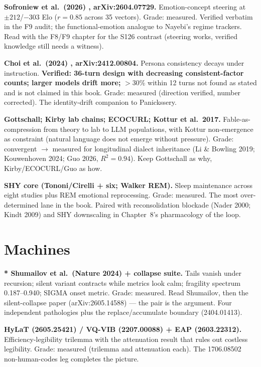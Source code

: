 \textbf{Sofroniew et al.\ (2026) \cite{sofroniew2026}, arXiv:2604.07729.} Emotion-concept steering at $\pm212$/$-$303 Elo ($r=0.85$ across 35 vectors). Grade: measured. Verified verbatim in the F9 audit; the functional-emotion analogue to Nayebi's regime trackers. Read with the F8/F9 chapter for the S126 contrast (steering works, verified knowledge still needs a witness).

\textbf{Choi et al.\ (2024) \cite{choi2024}, arXiv:2412.00804.} Persona consistency decays under instruction. \textbf{Verified: 36-turn design with decreasing consistent-factor counts; larger models drift more; }$>$30\% within 12 turns not found as stated and is not claimed in this book. Grade: measured (direction verified, number corrected). The identity-drift companion to Panickssery.

\textbf{Gottschall; Kirby lab chains; ECOCURL; Kottur et al.\ 2017.} Fable-as-compression from theory to lab to LLM populations, with Kottur non-emergence as constraint (natural language does not emerge without pressure). Grade: convergent $\to$ measured for longitudinal dialect inheritance (Li \& Bowling 2019; Kouwenhoven 2024; Guo 2026, $R^2=0.94$). Keep Gottschall as why, Kirby/ECOCURL/Guo as how.

\textbf{SHY core (Tononi/Cirelli + six; Walker REM).} Sleep maintenance across eight studies plus REM emotional reprocessing. Grade: measured. The most over-determined lane in the book. Paired with reconsolidation blockade (Nader 2000; Kindt 2009) and SHY downscaling in Chapter~8's pharmacology of the loop.

\section*{Machines}

\textbf{* Shumailov et al.\ (Nature 2024) \cite{shumailov2024} + collapse suite.} Tails vanish under recursion; silent variant contracts while metrics look calm; fragility spectrum 0.187--0.940; SIGMA onset metric. Grade: measured. Read Shumailov, then the silent-collapse paper (arXiv:2605.14588) --- the pair is the argument. Four independent pathologies plus the replace/accumulate boundary (2404.01413).

\textbf{HyLaT (2605.25421) / VQ-VIB (2207.00088) + EAP (2603.22312).} Efficiency-legibility trilemma with the attenuation result that rules out costless legibility. Grade: measured (trilemma and attenuation each). The 1706.08502 non-human-codes leg completes the picture.


